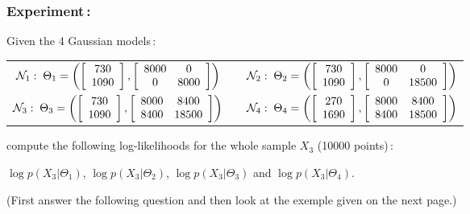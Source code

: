\documentclass[twoside,a4paper,titlepage]{article}
\begin{document}
\subsubsection*{Experiment\,:}
Given the 4 Gaussian models\,:
\begin{center}
\begin{tabular}{ccc}
${\cal N}_1: \; \Theta_1 = \left(
\left[\begin{array}{c}730 \\ 1090\end{array}\right],
\left[\begin{array}{cc}8000 & 0 \\ 0 & 8000\end{array}\right]
\right)$ & \hspace{2cm} &
${\cal N}_2: \; \Theta_2 = \left(
\left[\begin{array}{c}730 \\ 1090\end{array}\right],
\left[\begin{array}{cc}8000 & 0 \\ 0 & 18500\end{array}\right]
\right)$ \\[2em]
${\cal N}_3: \; \Theta_3 = \left(
\left[\begin{array}{c}730 \\ 1090\end{array}\right],
\left[\begin{array}{cc}8000 & 8400 \\ 8400 & 18500\end{array}\right]
\right)$ & \hspace{2cm} &
${\cal N}_4: \; \Theta_4 = \left(
\left[\begin{array}{c}270 \\ 1690\end{array}\right],
\left[\begin{array}{cc}8000 & 8400 \\ 8400 & 18500\end{array}\right]
\right)$
\end{tabular}
\end{center}
\vspace{0.5em} compute the following {log-likelihoods} for the whole sample
$X_3$ (10000 points)\,:

\medskip
\centerline{$\log p(X_3|\Theta_1)$, $\log p(X_3|\Theta_2)$, $\log
p(X_3|\Theta_3)$ and $\log p(X_3|\Theta_4)$.}

\medskip
\noindent (First answer the following question and then look at the exemple
given on the next page.)
\end{document}
